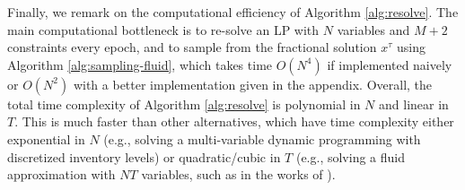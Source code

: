 \documentclass[opre]{informs3aa}
\newcommand{\vct}{\boldsymbol }
\newcommand{\poly}{\mathrm{poly}}
\begin{document}
Finally, we remark on the computational efficiency of Algorithm \ref{alg:resolve}. The main computational bottleneck is to re-solve an LP with $N$ variables and $M+2$ constraints every epoch, and to sample from the fractional solution $x^\tau$ using Algorithm \ref{alg:sampling-fluid}, which takes time $O(N^4)$
if implemented naively or $O(N^2)$ with a better implementation given in the appendix.
Overall, the total time complexity of Algorithm \ref{alg:resolve} is polynomial in $N$ and linear in $T$.
This is much faster than other alternatives, which have time complexity either exponential in $N$ (e.g., solving a multi-variable dynamic programming with discretized inventory levels) or quadratic/cubic in $T$ (e.g., solving a fluid approximation with $NT$ variables, such as in the works of \cite{lei2018randomized}).

%
%
\end{document}

